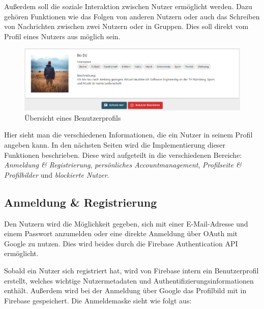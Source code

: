 Außerdem soll die soziale Interaktion zwischen Nutzer ermöglicht werden.
Dazu gehören Funktionen wie das Folgen von anderen Nutzern oder auch das Schreiben von Nachrichten zwischen zwei Nutzern oder in Gruppen.
Dies soll direkt vom Profil eines Nutzers aus möglich sein.

\begin{figure}[ht!]
  \begin{centering}
    \includegraphics[width=1\textwidth]{figures/implementation/profile-header.png}
    \caption{Übersicht eines Benutzerprofils}
    \label{fig:userProfileHeader}
  \end{centering}
\end{figure}

Hier sieht man die verschiedenen Informationen, die ein Nutzer in seinem Profil angeben kann.
In den nächsten Seiten wird die Implementierung dieser Funktionen beschrieben.
Diese wird aufgeteilt in die verschiedenen Bereiche: \textit{Anmeldung \& Registrierung}, \textit{persönliches Accountmanagement}, \textit{Profilseite \& Profilbilder} und \textit{blockierte Nutzer}.

\subsection{Anmeldung \& Registrierung}
\label{sec:login}

Den Nutzern wird die Möglichkeit gegeben, sich mit einer E-Mail-Adresse und einem Passwort anzumelden oder eine direkte Anmeldung über OAuth mit Google zu nutzen.
Dies wird beides durch die Firebase Authentication API ermöglicht.

Sobald ein Nutzer sich registriert hat, wird von Firebase intern ein Benutzerprofil erstellt, welches wichtige Nutzermetadaten und Authentifizierungsinformationen enthält.
Außerdem wird bei der Anmeldung über Google das Profilbild mit in Firebase gespeichert.
Die Anmeldemaske sieht wie folgt aus:

